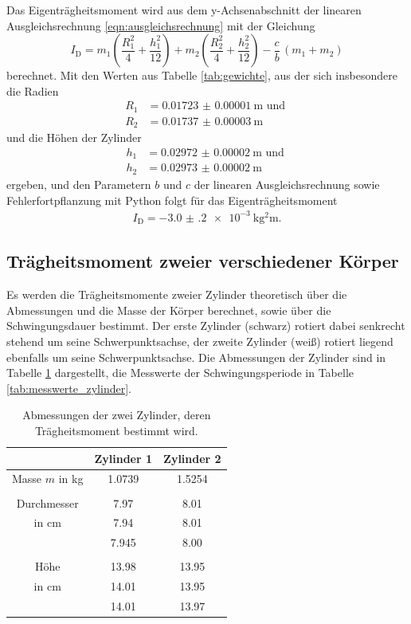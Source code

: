 Das Eigenträgheitsmoment wird aus dem y-Achsenabschnitt der linearen
Ausgleichsrechnung \eqref{eqn:ausgleichsrechnung} mit der Gleichung
\begin{equation}
  I_\text{D} = m_1\left(\frac{R_1^2}{4} + \frac{h_1^2}{12}\right) + m_2 \left(
  \frac{R_2^2}{4}+\frac{h_2^2}{12}\right) - \frac{c}{b}\, (m_1 + m_2)
  \label{eqn:eigentraegheitsmoment}
\end{equation}
berechnet. Mit den Werten aus Tabelle \ref{tab:gewichte}, aus der sich insbesondere
die Radien
\begin{align*}
  R_1 &= \SI{0.01723(1)}{\meter} \text{ und }\\
  R_2 &= \SI{0.01737(3)}{\meter}
\end{align*}
und die Höhen der Zylinder
\begin{align*}
  h_1 &= \SI{0.02972(2)}{\meter} \text{ und } \\
  h_2 &= \SI{0.02973(2)}{\meter}
\end{align*}
ergeben, und den Parametern $b$ und $c$ der linearen Ausgleichsrechnung sowie
Fehlerfortpflanzung mit Python folgt für das Eigenträgheitsmoment
\begin{align*}
  I_\text{D} = \SI{-3.0(2)e-3}{\kilo\gram\squared\meter}.
\end{align*}

\subsection{Trägheitsmoment zweier verschiedener Körper}
Es werden die Trägheitsmomente zweier Zylinder theoretisch über die Abmessungen
und die Masse der Körper berechnet, sowie über die Schwingungsdauer bestimmt.
Der erste Zylinder (schwarz) rotiert dabei senkrecht stehend um seine
Schwerpunktsachse, der zweite Zylinder (weiß) rotiert liegend ebenfalls um seine
Schwerpunktsachse.
Die Abmessungen der Zylinder sind in Tabelle \ref{tab:abmessungen_zylinder}
dargestellt, die Messwerte der Schwingungsperiode in Tabelle
\ref{tab:messwerte_zylinder}.
\begin{table}
  \centering
  \begin{tabular}{c| c c}
    \toprule
        & Zylinder 1 & Zylinder 2 \\
    \midrule
    Masse $m$ in \si{\kilo\gram} & 1.0739 & 1.5254 \\
    & & \\
    Durchmesser          & 7.97 & 8.01  \\
    in \si{\centi\meter} & 7.94 & 8.01  \\
                         & 7.945 & 8.00  \\
    & & \\
    Höhe                 & 13.98 & 13.95 \\
    in \si{\centi\meter} & 14.01 & 13.95 \\
                         & 14.01 & 13.97 \\
    \bottomrule
  \end{tabular}
  \caption{Abmessungen der zwei Zylinder, deren Trägheitsmoment bestimmt wird.}
  \label{tab:abmessungen_zylinder}
\end{table}


